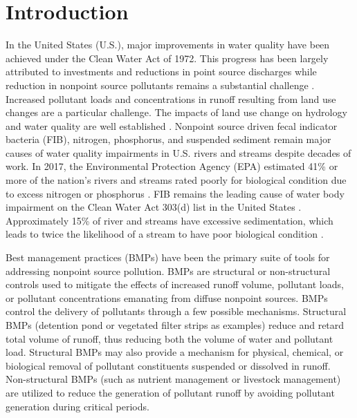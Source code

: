 \documentclass[utf8]{FrontiersinHarvard}
\begin{document}
\hypertarget{introduction}{%
\section{Introduction}\label{introduction}}

In the United States (U.S.), major improvements in water quality have been achieved under the Clean Water Act of 1972.
This progress has been largely attributed to investments and reductions in point source discharges while reduction in nonpoint source pollutants remains a substantial challenge \citep{nationalresearchcouncilAssessingTMDLApproach2001, benhamLessonsLearnedTMDL2008, schrammTotalMaximumDaily2022}.
Increased pollutant loads and concentrations in runoff resulting from land use changes are a particular challenge.
The impacts of land use change on hydrology and water quality are well established \citep{allanLandscapesRiverscapesInfluence2004, carpenterNonpointPollutionSurface1998, bernhardtUnderstandingManagingMinimizing2008, careyEvaluatingNutrientImpacts2013, freemanImpactsUrbanizationDevelopment2019}.
Nonpoint source driven fecal indicator bacteria (FIB), nitrogen, phosphorus, and suspended sediment remain major causes of water quality impairments in U.S. rivers and streams despite decades of work.
In 2017, the Environmental Protection Agency (EPA) estimated 41\% or more of the nation's rivers and streams rated poorly for biological condition due to excess nitrogen or phosphorus \citep{epaNationalWaterQuality2017}.
FIB remains the leading cause of water body impairment on the Clean Water Act 303(d) list in the United States \citep{epaNationalWaterQuality2017}.
Approximately 15\% of river and streams have excessive sedimentation, which leads to twice the likelihood of a stream to have poor biological condition \citep{epaNationalWaterQuality2017}.

Best management practices (BMPs) have been the primary suite of tools for addressing nonpoint source pollution.
BMPs are structural or non-structural controls used to mitigate the effects of increased runoff volume, pollutant loads, or pollutant concentrations emanating from diffuse nonpoint sources.
BMPs control the delivery of pollutants through a few possible mechanisms.
Structural BMPs (detention pond or vegetated filter strips as examples) reduce and retard total volume of runoff, thus reducing both the volume of water and pollutant load.
Structural BMPs may also provide a mechanism for physical, chemical, or biological removal of pollutant constituents suspended or dissolved in runoff.
Non-structural BMPs (such as nutrient management or livestock management) are utilized to reduce the generation of pollutant runoff by avoiding pollutant generation during critical periods.
\end{document}
